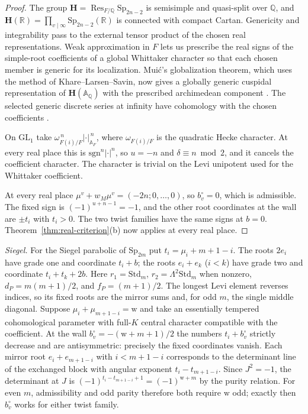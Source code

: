 \documentclass[12pt]{amsart}
\numberwithin{equation}{section}
\theoremstyle{plain}
\theoremstyle{definition}
\theoremstyle{remark}
\newcommand{\Q}{\mathbb Q}
\newcommand{\A}{\mathbb A}
\newcommand{\R}{\mathbb R}
\newcommand{\GL}{\mathrm{GL}}
\newcommand{\Sp}{\mathrm{Sp}}
\newcommand{\Std}{\mathrm{Std}}
\newcommand{\sgn}{\mathrm{sgn}}
\begin{document}
\begin{proof}
The group $\mathbf H=\operatorname{Res}_{F/\Q}\Sp_{2n-2}$ is semisimple and quasi-split over $\Q$, and $\mathbf H(\R)=\prod_{v\mid\infty}\Sp_{2n-2}(\R)$ is connected with compact Cartan. Genericity and integrability pass to the external tensor product of the chosen real representations. Weak approximation in $F$ lets us prescribe the real signs of the simple-root coefficients of a global Whittaker character so that each chosen member is generic for its localization. Mui\'c's globalization theorem, which uses the method of Khare--Larsen--Savin, now gives a globally generic cuspidal representation of $\mathbf H(\mathbb A_\Q)$ with the prescribed archimedean component \cite{Muic2016,KhareLarsenSavin2008}. The selected generic discrete series at infinity have cohomology with the chosen coefficients \cite[Ch.~II]{BorelWallach}.

On $\GL_1$ take $\omega_{F(i)/F}^{\,n}|\cdot|_{\A_F}^{\,n}$, where $\omega_{F(i)/F}$ is the quadratic Hecke character. At every real place this is $\sgn^n|\cdot|^n$, so $u=-n$ and $\delta\equiv n\bmod 2$, and it cancels the coefficient character. The character is trivial on the Levi unipotent used for the Whittaker coefficient.

At every real place $\mu^v+w_M\mu^v=(-2n;0,\ldots,0)$, so $b_v^\circ=0$, which is admissible. The fixed sign is $(-1)^{u+n-1}=-1$, and the other root coordinates at the wall are $\pm t_i$ with $t_i>0$. The two twist families have the same signs at $b=0$. Theorem~\ref{thm:real-criterion}(b) now applies at every real place.
\end{proof}

\emph{Siegel.} For the Siegel parabolic of $\Sp_{2m}$ put $t_i=\mu_i+m+1-i$. The roots $2e_i$ have grade one and coordinate $t_i+b$; the roots $e_i+e_k$ ($i<k$) have grade two and coordinate $t_i+t_k+2b$. Here $r_1=\Std_m$, $r_2=\Lambda^2\Std_m$ when nonzero, $d_P=m(m+1)/2$, and $f_P=(m+1)/2$. The longest Levi element reverses indices, so its fixed roots are the mirror sums and, for odd $m$, the single middle diagonal. Suppose $\mu_i+\mu_{m+1-i}=\mathrm{w}$ and take an essentially tempered cohomological parameter with full-$K$ central character compatible with the coefficient. At the wall $b_v^\circ=-(\mathrm{w}+m+1)/2$ the numbers $t_i+b_v^\circ$ strictly decrease and are antisymmetric: precisely the fixed coordinates vanish. Each mirror root $e_i+e_{m+1-i}$ with $i<m+1-i$ corresponds to the determinant line of the exchanged block with angular exponent $t_i-t_{m+1-i}$. Since $J^2=-1$, the determinant at $J$ is $(-1)^{t_i-t_{m+1-i}+1}=(-1)^{\mathrm{w}+m}$ by the purity relation. For even $m$, admissibility and odd parity therefore both require $\mathrm{w}$ odd; exactly then $b_v^\circ$ works for either twist family.
\end{document}
